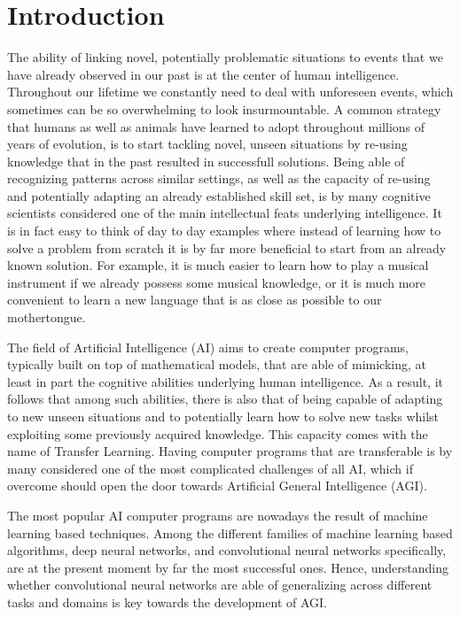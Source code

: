 \chapter*{Introduction}
\label{ch:introduction}

The ability of linking novel, potentially problematic situations to events that we have already observed in our past is at the center of human intelligence. Throughout our lifetime we constantly need to deal with unforeseen events, which sometimes can be so overwhelming to look insurmountable. A common strategy that humans as well as animals have learned to adopt throughout millions of years of evolution, is to start tackling novel, unseen situations by re-using knowledge that in the past resulted in successfull solutions. Being able of recognizing patterns across similar settings, as well as the capacity of re-using and potentially adapting an already established skill set, is by many cognitive scientists considered one of the main intellectual feats underlying intelligence. It is in fact easy to think of day to day examples where instead of learning how to solve a problem from scratch it is by far more beneficial to start from an already known solution. For example, it is much easier to learn how to play a musical instrument if we already possess some musical knowledge, or it is much more convenient to learn a new language that is as close as possible to our mothertongue.

The field of Artificial Intelligence (AI) aims to create computer programs, typically built on top of mathematical models, that are able of mimicking, at least in part the cognitive abilities underlying human intelligence. As a result, it follows that among such abilities, there is also that of being capable of adapting to new unseen situations and to potentially learn how to solve new tasks whilst exploiting some previously acquired knowledge. This capacity comes with the name of Transfer Learning. Having computer programs that are transferable is by many considered one of the most complicated challenges of all AI, which if overcome should open the door towards Artificial General Intelligence (AGI). 

The most popular AI computer programs are nowadays the result of machine learning based techniques. Among the different families of machine learning based algorithms, deep neural networks, and convolutional neural networks specifically, are at the present moment by far the most successful ones. Hence, understanding whether convolutional neural networks are able of generalizing across different tasks and domains is key towards the development of AGI. 

